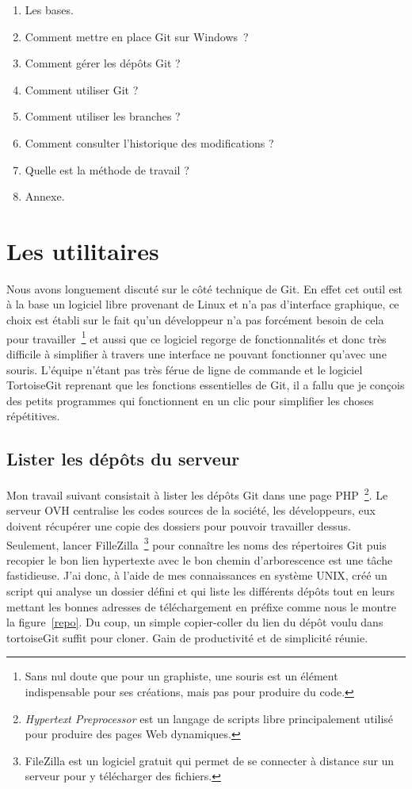 \begin{enumerate}
    \item Les bases.
    \item Comment mettre en place Git sur Windows~\textregistered ?
    \item Comment gérer les dépôts Git ?
    \item Comment utiliser Git ?
    \item Comment utiliser les branches ?
    \item Comment consulter l'historique des modifications ?
    \item Quelle est la méthode de travail ?
    \item Annexe.
\end{enumerate}

\section{Les utilitaires} %
\label{sec:Les utilitaires}

Nous avons longuement discuté sur le côté technique de Git. En effet cet
outil est à la base un logiciel libre provenant de Linux et n'a pas
d'interface graphique, ce choix est établi sur le fait qu'un développeur
n'a pas forcément besoin de cela pour travailler\, \footnote{Sans nul
doute que pour un graphiste, une souris est un élément indispensable
pour ses créations, mais pas pour produire du code.} et aussi que ce
logiciel regorge de fonctionnalités et donc très difficile à simplifier
à travers une interface ne pouvant fonctionner qu'avec une souris.
L'équipe n'étant pas très férue de ligne de commande et le logiciel
TortoiseGit reprenant que les fonctions essentielles de Git, il a fallu
que je conçois des petits programmes qui fonctionnent en un clic pour
simplifier les choses répétitives.

\subsection{Lister les dépôts du serveur} %
\label{sub:Lister les dépôts du serveur}

Mon travail suivant consistait à lister les dépôts Git dans une page
PHP\, \footnote{\emph{Hypertext Preprocessor} est un langage de scripts
libre principalement utilisé pour produire des pages Web dynamiques.}.
Le serveur OVH centralise les codes sources de la société, les
développeurs, eux doivent récupérer une copie des dossiers pour pouvoir
travailler dessus. Seulement, lancer FilleZilla\, \footnote{FileZilla
est un logiciel gratuit qui permet de se connecter à distance sur un
serveur pour y télécharger des fichiers.} pour connaître les noms des
répertoires Git puis recopier le bon lien hypertexte avec le bon chemin
d'arborescence est une tâche fastidieuse.  J'ai donc, à l'aide de mes
connaissances en système UNIX, créé un script qui analyse un dossier
défini et qui liste les différents dépôts tout en leurs mettant les
bonnes adresses de téléchargement en préfixe comme nous le montre la
figure~\ref{repo}. Du coup, un simple copier-coller du lien du dépôt
voulu dans tortoiseGit suffit pour cloner. Gain de productivité et de
simplicité réunie.

